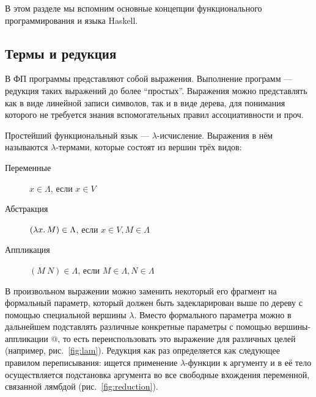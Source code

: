 В этом разделе мы вспомним основные концепции функционального программирования и языка Haskell.

\subsection{Термы и редукция} \label{subsec:terms-reduction}

В ФП программы представляют собой выражения.
Выполнение программ --- редукция таких выражений до более ``простых''.
Выражения можно представлять как в виде линейной записи символов, так и в виде дерева, для понимания которого не требуется знания вспомогательных правил ассоциативности и проч.

Простейший функциональный язык --- $\lambda$-исчисление.
Выражения в нём называются $\lambda$-термами, которые состоят из вершин трёх видов:
\begin{description}
    \item[Переменные] $x \in \Lambda$, если $x \in V$ \hspace{2em}
    \item[Абстракция] $(\lambda x\ldotp M) \in \Lambda$, если $x \in V, M \in \Lambda$ \hspace{2em}
    \item[Аппликация] $(M~N) \in \Lambda$, если $M \in \Lambda, N \in \Lambda$ \hspace{2em}
\end{description}

В произвольном выражении можно заменить некоторый его фрагмент на формальный параметр, который должен быть задекларирован выше по дереву с помощью специальной вершины $\lambda$.
Вместо формального параметра можно в дальнейшем подставлять различные конкретные параметры с помощью вершины-аппликации $@$, то есть переиспользовать это выражение для различных целей (например, рис.\ \ref{fig:lam}).
Редукция как раз определяется как следующее правилом переписывания: ищется применение $\lambda$-функции к аргументу и в её тело осуществляется подстановка аргумента во все свободные вхождения переменной, связанной лямбдой (рис.\ \ref{fig:reduction}).

